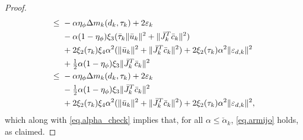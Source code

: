 \begin{proof}
\begin{align*}
        \leq&\ - \alpha \eta_{\phi} \Delta m_k(d_k, \tau_k)+ 2 \varepsilon_k \\
        &\ -  \alpha (1 - \eta_{\phi}) \xi_3 ({\bar \tau}_k \|{\bar u}_k\|^2 + \|{\bar J}_k^T {\bar c}_k\|^2 ) \\
        &\ + 2 \xi_2(\tau_k) \xi_4 \alpha^2 (\|{\bar u}_k\|^2 + \|{\bar J}_k^T {\bar c}_k\|^2 ) + 2 \xi_2(\tau_k) \alpha^2 \|\varepsilon_{d,k}\|^2 \\
        &\ + \tfrac{1}{2} \alpha (1 - \eta_\phi) \xi_3 \|{\bar J}_k^T {\bar c}_k\|^2 \\
        \leq&\ - \alpha \eta_{\phi} \Delta m_k(d_k,\tau_k) + 2 \varepsilon_k  \\
        &\ -  \tfrac12 \alpha (1 - \eta_{\phi}) \xi_3  \|{\bar J}_k^T {\bar c}_k\|^2  \\
        &\ + 2 \xi_2(\tau_k) \xi_4 \alpha^2 (\|{\bar u}_k\|^2 + \|{\bar J}_k^T {\bar c}_k\|^2 ) + 2 \xi_2(\tau_k) \alpha^2 \|\varepsilon_{d,k}\|^2,
    \end{align*}
    which along with \eqref{eq.alpha_check} implies that, for all $\alpha \leq \check \alpha_k$, \eqref{eq.armijo} holds, as claimed.
   

\end{proof}
